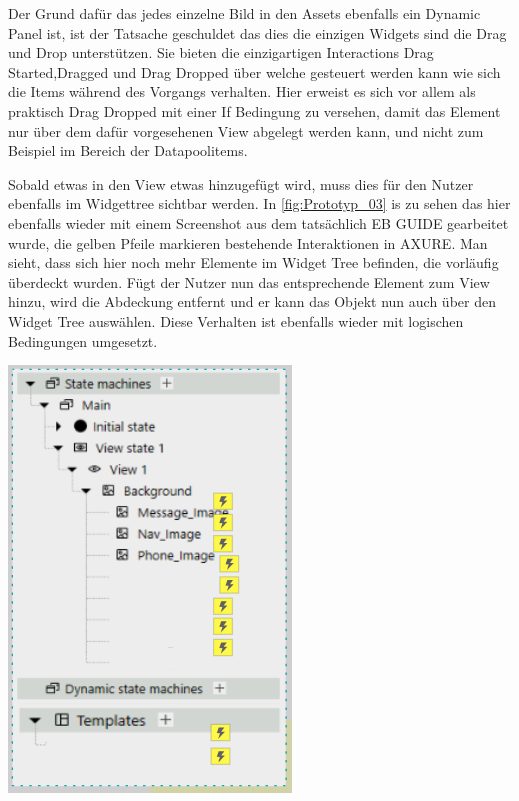Der Grund dafür das jedes einzelne Bild in den Assets ebenfalls ein Dynamic Panel ist, ist der Tatsache geschuldet das dies die einzigen Widgets sind die Drag und Drop unterstützen.
Sie bieten die einzigartigen Interactions \glqq Drag Started\grqq{},\glqq Dragged\grqq{} und \glqq Drag Dropped\grqq{} über welche gesteuert werden kann wie sich die Items während des Vorgangs verhalten.
Hier erweist es sich vor allem als praktisch \glqq Drag Dropped\grqq{} mit einer If Bedingung zu versehen, damit das Element nur über dem dafür vorgesehenen View abgelegt werden kann, und nicht zum Beispiel im Bereich der Datapoolitems.

Sobald etwas in den View etwas hinzugefügt wird, muss dies für den Nutzer ebenfalls im Widgettree sichtbar werden.
In \cref{fig:Prototyp_03} is zu sehen das hier ebenfalls wieder mit einem Screenshot aus dem tatsächlich EB GUIDE gearbeitet wurde, die gelben Pfeile markieren bestehende Interaktionen in AXURE.
Man sieht, dass sich hier noch mehr Elemente im Widget Tree befinden, die vorläufig überdeckt wurden.
Fügt der Nutzer nun das entsprechende Element zum View hinzu, wird die Abdeckung entfernt und er kann das Objekt nun auch über den Widget Tree auswählen.
Diese Verhalten ist ebenfalls wieder mit logischen Bedingungen umgesetzt.

\begin{center}
  \includegraphics[scale=0.8]{figures/Prototyp_03.PNG}
  \label{fig:Prototyp_03}
\end{center}


